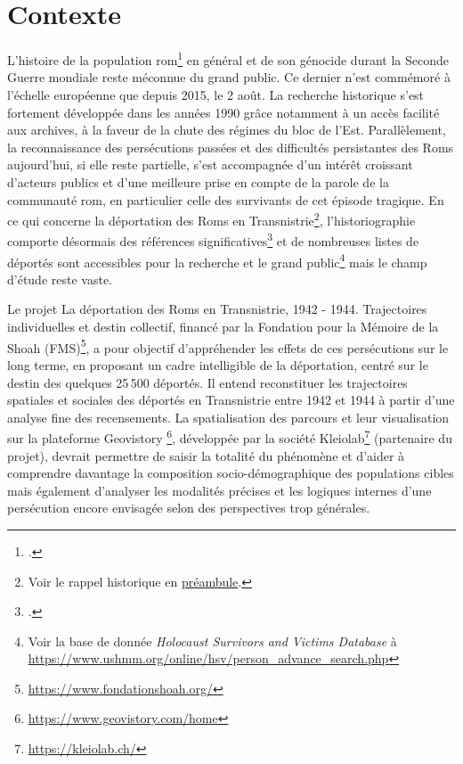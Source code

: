 \documentclass[a4paper,12pt,twoside]{book}
\begin{document}
	    \section*{Contexte}
	            L'histoire de la population rom\footcite[La plus importante minorité ethnique européenne (estimée entre 10 et 12 millions), voir :][]{EgaliteInclusionParticipation} en général et de son génocide durant la Seconde Guerre mondiale reste méconnue du grand public. Ce dernier n'est commémoré à l'échelle européenne que depuis 2015, le 2 août. La recherche historique s'est fortement développée dans les années 1990 grâce notamment à un accès facilité aux archives, à la faveur de la chute des régimes du bloc de l'Est. Parallèlement, la reconnaissance des persécutions passées et des difficultés persistantes des Roms aujourd'hui, si elle reste partielle, s'est accompagnée d'un intérêt croissant d'acteurs publics et d'une meilleure prise en compte de la parole de la communauté rom, en particulier celle des survivants de cet épisode tragique. En ce qui concerne la déportation des Roms en Transnistrie\footnote{Voir le rappel historique en \hyperref[rappels]{préambule}.}, l'historiographie comporte désormais des références significatives\footcites[Quelques titres de référence détaillant la déportation des Roms :][]{achimRomaRomanianHistory2004,achimDeportationRromsTransnistrie2016,internationalcommisionontheholocaustinromaniaFinalReport2005a,aboutGenocidePersecutionRoma2016} et de nombreuses listes de déportés sont accessibles pour la recherche et le grand public\footnote{Voir la base de donnée \textit{Holocaust Survivors and Victims Database} à \url{https://www.ushmm.org/online/hsv/person_advance_search.php}} mais le champ d'étude reste vaste.
	            
	            Le projet \og{}La déportation des Roms en Transnistrie, 1942 - 1944. Trajectoires individuelles et destin collectif\fg{}, financé par la Fondation pour la Mémoire de la Shoah (FMS)\footnote{\url{https://www.fondationshoah.org/}}, a pour objectif d’appréhender les effets de ces persécutions sur le long terme, en proposant un cadre intelligible de la déportation, centré sur le destin des quelques 25\,500 déportés. Il entend reconstituer les trajectoires spatiales et sociales des déportés en Transnistrie entre 1942 et 1944 à partir d’une analyse fine des recensements. La spatialisation des parcours et leur visualisation sur la plateforme Geovistory \footnote{\url{https://www.geovistory.com/home}\label{geo}}, développée par la société Kleiolab\footnote{\url{https://kleiolab.ch/}\label{kleio}} (partenaire du projet), devrait permettre de saisir la totalité du phénomène et d'aider à comprendre davantage la composition socio-démographique des populations cibles mais également d'analyser les modalités précises et les logiques internes d’une persécution encore envisagée selon des perspectives trop générales.
	            
\end{document}
